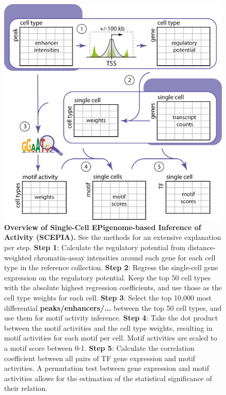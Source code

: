 \begin{figure}
    \centering
    \includegraphics[width=1\linewidth]{ch.scepia/imgs/20231106_OverviewFigure_SvH_v5.png}
    \caption{\textbf{Overview of Single-Cell EPigenome-based Inference of Activity (SCEPIA).} See the methods for an extensive explanation per step. \newline 
    \textbf{Step 1}: Calculate the regulatory potential from distance-weighted chromatin-assay intensities around each gene for each cell type in the reference collection.
    \textbf{Step 2}: Regress the single-cell gene expression on the regulatory potential. Keep the top 50 cell types with the absolute highest regression coefficients, and use those as the cell type weights for each cell.
    \textbf{Step 3}: Select the top 10,000 most differential \textbf{peaks/enhancers/...} between the top 50 cell types, and use them for motif activity inference.
    \textbf{Step 4}: Take the dot product between the motif activities and the cell type weights, resulting in motif activities for each motif per cell. Motif activities are scaled to a motif score between 0-1. 
    \textbf{Step 5}: Calculate the correlation coefficient between all pairs of TF gene expression and motif activities. A permutation test  between gene expression and motif activities allows for the estimation of the statistical significance of their relation.}
    \label{fig:scepia_overview}
\end{figure}


